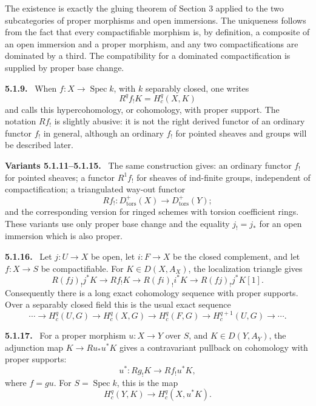 \documentclass[12pt]{article}
\newcommand{\Spec}{\operatorname{Spec}}
\newenvironment{statement}[1]{\par\medskip\noindent\textbf{#1.}\ }{\par\medskip}
\newenvironment{remarktext}[1]{\par\medskip\noindent\textbf{#1.}\ }{\par\medskip}
\begin{document}
The existence is exactly the gluing theorem of Section 3 applied to the two subcategories of proper morphisms and open immersions. The uniqueness follows from the fact that every compactifiable morphism is, by definition, a composite of an open immersion and a proper morphism, and any two compactifications are dominated by a third. The compatibility for a dominated compactification is supplied by proper base change.

\begin{remarktext}{5.1.9}
When \(f:X\to\Spec k\), with \(k\) separably closed, one writes
\[
R^qf_!K=H^q_c(X,K)
\]
and calls this hypercohomology, or cohomology, with proper support. The notation \(Rf_!\) is slightly abusive: it is not the right derived functor of an ordinary functor \(f_!\) in general, although an ordinary \(f_!\) for pointed sheaves and groups will be described later.
\end{remarktext}

\begin{statement}{Variants 5.1.11--5.1.15}
The same construction gives: an ordinary functor \(f_!\) for pointed sheaves; a functor \(R^1f_!\) for sheaves of ind-finite groups, independent of compactification; a triangulated way-out functor
\[
Rf_!:D^+_{\mathrm{tors}}(X)\to D^+_{\mathrm{tors}}(Y);
\]
and the corresponding version for ringed schemes with torsion coefficient rings. These variants use only proper base change and the equality \(j_!=j_*\) for an open immersion which is also proper.
\end{statement}

\begin{statement}{5.1.16}
Let \(j:U\to X\) be open, let \(i:F\to X\) be the closed complement, and let \(f:X\to S\) be compactifiable. For \(K\in D(X,A_X)\), the localization triangle gives
\[
R(fj)_!j^*K\to Rf_!K\to R(fi)_!i^*K\to R(fj)_!j^*K[1].
\]
Consequently there is a long exact cohomology sequence with proper supports. Over a separably closed field this is the usual exact sequence
\[
\cdots\to H^q_c(U,G)\to H^q_c(X,G)\to H^q_c(F,G)\to H^{q+1}_c(U,G)\to\cdots .
\]
\end{statement}

\begin{statement}{5.1.17}
For a proper morphism \(u:X\to Y\) over \(S\), and \(K\in D(Y,A_Y)\), the adjunction map \(K\to Ru_*u^*K\) gives a contravariant pullback on cohomology with proper supports:
\[
u^*:Rg_!K\to Rf_!u^*K,
\]
where \(f=g u\). For \(S=\Spec k\), this is the map
\[
H^q_c(Y,K)\to H^q_c(X,u^*K).
\]
\end{statement}
\end{document}

